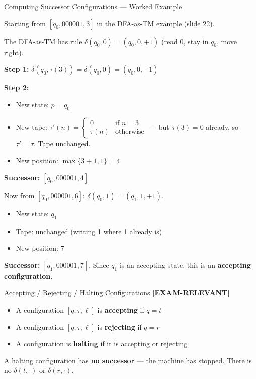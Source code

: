 \documentclass[11pt,a4paper]{article}
\newcommand{\kemark}{\textcolor{red!70!black}{\textbf{[EXAM-RELEVANT]}}}
\begin{document}
\begin{examplebox}{Computing Successor Configurations --- Worked Example}

Starting from $[q_0, 000001, 3]$ in the DFA-as-TM example (slide 22).

The DFA-as-TM has rule $\delta(q_0, 0) = (q_0, 0, +1)$ (read 0, stay in $q_0$, move right).

\textbf{Step 1:} $\delta(q_0, \tau(3)) = \delta(q_0, 0) = (q_0, 0, +1)$

\textbf{Step 2:}
\begin{itemize}[nosep]
\item New state: $p = q_0$
\item New tape: $\tau'(n) = \begin{cases} 0 & \text{if } n = 3 \\ \tau(n) & \text{otherwise} \end{cases}$ --- but $\tau(3) = 0$ already, so $\tau' = \tau$. Tape unchanged.
\item New position: $\max\{3 + 1, 1\} = 4$
\end{itemize}

\textbf{Successor:} $[q_0, 000001, 4]$

Now from $[q_0, 000001, 6]$: $\delta(q_0, 1) = (q_1, 1, +1)$.
\begin{itemize}[nosep]
\item New state: $q_1$
\item Tape: unchanged (writing 1 where 1 already is)
\item New position: 7
\end{itemize}
\textbf{Successor:} $[q_1, 000001, 7]$. Since $q_1$ is an accepting state, this is an \textbf{accepting configuration}.
\end{examplebox}

\begin{definitionbox}{{Accepting / Rejecting / Halting Configurations \kemark}}
\begin{itemize}[nosep]
\item A configuration $[q, \tau, \ell]$ is \textbf{accepting} if $q = t$
\item A configuration $[q, \tau, \ell]$ is \textbf{rejecting} if $q = r$
\item A configuration is \textbf{halting} if it is accepting or rejecting
\end{itemize}

A halting configuration has \textbf{no successor} --- the machine has stopped. There is no $\delta(t, \cdot)$ or $\delta(r, \cdot)$.
\end{definitionbox}
\end{document}
